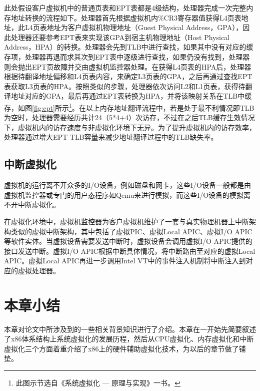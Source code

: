 此处假设客户虚拟机中的普通页表和EPT表都是4级结构，处理器完成一次完整内存地址转换的流程如下。处理器首先根据虚拟机内\%CR3寄存器值获得L4页表地址，此L4页表地址为客户虚拟机物理地址（Guest Physical Address，GPA），因此处理器还要参考EPT表来实现该GPA到宿主机物理地址（Host Physical Address，HPA）的转换。处理器会先到TLB中进行查找，如果其中没有对应的缓存项，处理器再退而求其次到EPT表中逐级进行查找，如果仍没有找到，处理器则会抛出EPT页故障并交由虚拟机监控器处理。在获得L4页表的HPA后，处理器根据待翻译地址偏移和L4页表内容，来确定L3页表的GPA，之后再通过查找EPT表获取L3页表的HPA。按照类似的步骤，处理器依次访问L2和L1页表，获得待翻译地址对应的GPA，最后再通过EPT表转换为HPA，并将该映射关系在TLB中缓存，如图\ref{fig:ept}所示\footnote{此图示节选自《系统虚拟化 — 原理与实现》一书。}。在以上内存地址翻译流程中，若是处于最不利情况即TLB为空时，处理器需要经历共计24（5*4+4）次访存，不过在之后TLB缓存生效情况下，虚拟机内的访存速度与非虚拟化环境下无异。为了提升虚拟机内的访存效率，处理器通过增大EPT TLB容量来减少地址翻译过程中的TLB缺失率。

\subsection{中断虚拟化}

虚拟机的运行离不开众多的I/O设备，例如磁盘和网卡，这些I/O设备一般都是由虚拟机监控器或专门的用户态程序如Qemu来进行模拟，而这些I/O设备的模拟离不开中断虚拟化。

在虚拟化环境中，虚拟机监控器为客户虚拟机维护了一套与真实物理机器上中断架构类似的虚拟中断架构，其中包括了虚拟PIC、虚拟Local APIC、虚拟I/O APIC等软件实体。当虚拟设备需要发送中断时，虚拟设备会调用虚拟I/O APIC提供的接口发送中断。虚拟I/O APIC根据中断具体情况，将中断路由至对应的虚拟Local APIC。虚拟Local APIC再进一步调用Intel VT中的事件注入机制将中断注入到对应的虚拟处理器。

\section{本章小结}

本章对论文中所涉及到的一些相关背景知识进行了介绍。本章在一开始先简要叙述了x86体系结构上系统虚拟化的发展历程，然后从CPU虚拟化、内存虚拟化和中断虚拟化三个方面着重介绍了x86上的硬件辅助虚拟化技术，为以后的章节做了铺垫。